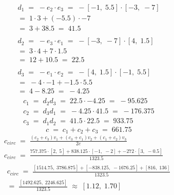 \documentclass[12pt, a4paper]{article}
\begin{document}
			\begin{gather*}
				\begin{aligned}
					d_1\;=\;-e_2\cdot e_3\;=\;
					-[-1,\;5.5]\cdot[-3,\;-7]\\
					=\;1\cdot3+(-5.5)\cdot-7\\
					=\;3+38.5\;=\;41.5
				\end{aligned}\\
				\begin{aligned}
					d_2\;=\;-e_3\cdot e_1\;=\;
					-[-3,\;-7]\cdot[4,\;1.5]\\
					=\;3\cdot4+7\cdot1.5\\
					=\;12+10.5\;=\;22.5
				\end{aligned}\\
				\begin{aligned}
					d_3\;=\;-e_1\cdot e_2\;=\;
					-[4,\;1.5]\cdot[-1,\;5.5]\\
					=\;-4\cdot-1+-1.5\cdot5.5\\
					=\;4-8.25\;=\;-4.25
				\end{aligned}
			\end{gather*}
			\begin{gather*}
				c_1\;=\;d_2d_3\;=\;22.5\cdot-4.25
					\;=\;-95.625\\
				c_2\;=\;d_3d_1\;=\;-4.25\cdot41.5
					\;=\;-176.375\\
				c_3\;=\;d_1d_2\;=\;41.5\cdot22.5
					\;=\;933.75
			\end{gather*}
			\begin{equation*}
				c\;=\;c_1+c_2+c_3\;=\;661.75
			\end{equation*}
\newpage
			\begin{gather*}
				c_{circ}\;=\;
					\frac{
						(c_2+c_3)v_1+(c_3+c_1)v_2
						+(c_1+c_2)v_3
					}{2c}
					\\
				c_{circ}\;=\;
					\frac{
						757.375\cdot[2,\;5] +
						838.125\cdot[-1,\;-2] +
						-272\cdot[3,\;-0.5]
					}{
						1323.5
					}
					\\
				\begin{aligned}
					c_{circ}\;=\;
						\frac{
							[1514.75,\;3786.875] +
							[-838.125,\;-1676.25] +
							[816,\;136]
						}{
							1323.5					
						}\\=\;
						\frac{
							[1492.625,\;2246.625]
						}{
							1323.5
						}\;\approx\;
						[1.12,\;1.70]
				\end{aligned}
			\end{gather*}
\end{document}
